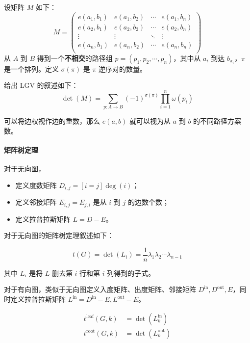\documentclass[10pt]{ctexart}
\providecommand{\tightlist}{\setlength{\itemsep}{0pt}\setlength{\parskip}{0pt}}
\begin{document}
\begin{multicols}{3}
    设矩阵 \(M\) 如下：\[
    M = \begin{pmatrix}
    e(a_1, b_1) & e(a_1, b_2) & \cdots & e(a_1, b_n) \\
    e(a_2, b_1) & e(a_2, b_2) & \cdots & e(a_2, b_n) \\
    \vdots & \vdots & \ddots & \vdots \\
    e(a_n, b_1) & e(a_n, b_2) & \cdots & e(a_n, b_n) \\
    \end{pmatrix}
    \] 从 \(A\) 到 \(B\) 得到一个\textbf{不相交}的路径组
    \(p=(p_1, p_2, \cdots,p_n)\)，其中从 \(a_i\) 到达
    \(b_{\pi_i}\)，\(\pi\) 是一个排列。定义 \(\sigma(\pi)\) 是 \(\pi\)
    逆序对的数量。

    给出 LGV 的叙述如下：\[
    \det(M) = \sum_{p:A\to B} (-1)^{\sigma (\pi)} \prod_{i=1}^n \omega(p_i)
    \]

    可以将边权视作边的重数，那么 \(e(a, b)\) 就可以视为从 \(a\) 到 \(b\)
    的不同路径方案数。

    \paragraph{矩阵树定理}\label{ux77e9ux9635ux6811ux5b9aux7406}

    对于无向图，

    \begin{itemize}
    \tightlist
    \item
      定义度数矩阵 \(D_{i, j} = [i=j]\deg(i)\)；
    \item
      定义邻接矩阵 \(E_{i, j} = E_{j, i}\) 是从 \(i\) 到 \(j\)
      的边数个数；
    \item
      定义拉普拉斯矩阵 \(L = D - E\)。
    \end{itemize}

    对于无向图的矩阵树定理叙述如下：

    \[t(G) = \det(L_i) = \frac{1}{n}\lambda_1\lambda_2\cdots \lambda_{n-1}\]

    其中 \(L_i\) 是将 \(L\) 删去第 \(i\) 行和第 \(i\) 列得到的子式。

    对于有向图，类似于无向图定义入度矩阵、出度矩阵、邻接矩阵
    \(D^{\mathrm{in}}, D^{\mathrm{out}}, E\)，同时定义拉普拉斯矩阵
    \(L^{\mathrm{in}} = D^{\mathrm{in}} - E,L^{\mathrm{out}} - E\)。

    \[\begin{aligned}
    t^{\mathrm{leaf}}(G, k) &= \det(L^{\mathrm{in}}_k) \\
    t^{\mathrm{root}}(G, k) &= \det(L^{\mathrm{out}}_k) \\
    \end{aligned}\]


\end{multicols}
\end{document}

